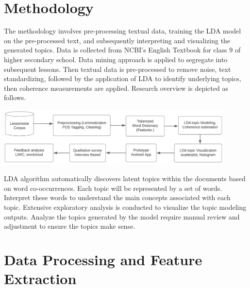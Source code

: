 \documentclass[sn-mathphys,Numbered]{sn-jnl}%
\theoremstyle{thmstyleone}%
\theoremstyle{thmstyletwo}%
\theoremstyle{thmstylethree}%
\begin{document}
\section{Methodology}
The methodology involves pre-processing textual data, training the LDA model on the pre-processed text, and subsequently interpreting and visualizing the generated topics. Data is collected from NCBI's English Textbook for class 9 of higher secondary school. Data mining approach is applied to segregate into subsequent lessons. Then textual data is pre-processed to remove noise, text standardizing, followed by the application of LDA to identify underlying topics, then coherence measurements are applied. Research overview is depicted as follows. 
\begin{adjustbox}{center, nofloat=figure, vspace=\bigskipamount, caption={Research workflow diagram}, label{fig:methodology_diagram}}
\includegraphics[width=0.9\textwidth]{Figs/methodology.png}
\end{adjustbox}

LDA algorithm automatically discovers latent topics within the documents based on word co-occurrences. Each topic will be represented by a set of words. Interpret these words to understand the main concepts associated with each topic. Extensive exploratory analysis is conducted to visualize the topic modeling outputs. Analyze the topics generated by the model require manual review and adjustment to ensure the topics make sense.

\section{Data Processing and Feature Extraction}
\end{document}

